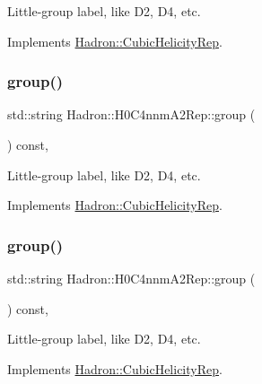 Little-\/group label, like D2, D4, etc. 

Implements \mbox{\hyperlink{structHadron_1_1CubicHelicityRep_a101a7d76cd8ccdad0f272db44b766113}{Hadron\+::\+Cubic\+Helicity\+Rep}}.

\mbox{\label{structHadron_1_1H0C4nnmA2Rep_a04d0d1b6a859d992423de875ce86f980}} 
\subsubsection{\texorpdfstring{group()}{group()}\hspace{0.1cm}{\footnotesize\ttfamily [3/5]}}
{\footnotesize\ttfamily std\+::string Hadron\+::\+H0\+C4nnm\+A2\+Rep\+::group (\begin{DoxyParamCaption}{ }\end{DoxyParamCaption}) const\hspace{0.3cm}{\ttfamily [inline]}, {\ttfamily [virtual]}}

Little-\/group label, like D2, D4, etc. 

Implements \mbox{\hyperlink{structHadron_1_1CubicHelicityRep_a101a7d76cd8ccdad0f272db44b766113}{Hadron\+::\+Cubic\+Helicity\+Rep}}.

\mbox{\label{structHadron_1_1H0C4nnmA2Rep_a04d0d1b6a859d992423de875ce86f980}} 
\subsubsection{\texorpdfstring{group()}{group()}\hspace{0.1cm}{\footnotesize\ttfamily [4/5]}}
{\footnotesize\ttfamily std\+::string Hadron\+::\+H0\+C4nnm\+A2\+Rep\+::group (\begin{DoxyParamCaption}{ }\end{DoxyParamCaption}) const\hspace{0.3cm}{\ttfamily [inline]}, {\ttfamily [virtual]}}

Little-\/group label, like D2, D4, etc. 

Implements \mbox{\hyperlink{structHadron_1_1CubicHelicityRep_a101a7d76cd8ccdad0f272db44b766113}{Hadron\+::\+Cubic\+Helicity\+Rep}}.

